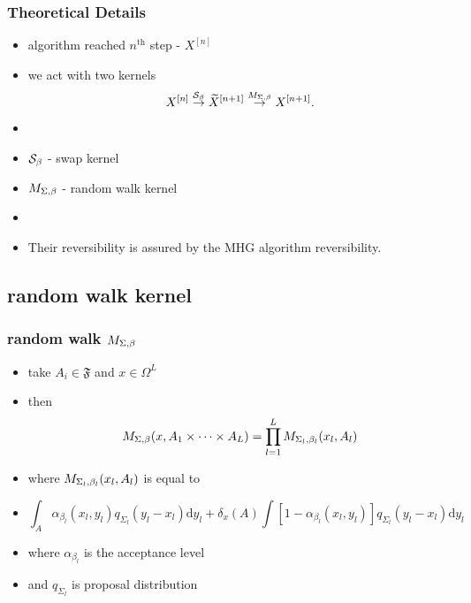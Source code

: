 \begin{frame}
		\frametitle{ Theoretical Details }

	\begin{itemize}
		\item[] algorithm reached $n^\text{th}$ step - $X^{[n]}$
		\item[] we act with two kernels
 $$X^{[n]} \overset{\mathcal{S}_{\beta}}{\rightarrow} \widetilde{X}^{[n +1]} \overset{M_{\Sigma,\beta}}{\rightarrow} X^{[n + 1]}.$$
		
		\item[]
		\item $\mathcal{S}_{\beta}$ - swap kernel
		\item $M_{\Sigma,\beta}$ - random walk kernel
		\item[]
		\item Their reversibility is assured by the MHG algorithm reversibility. 
	\end{itemize}

\end{frame}
		\subsection{random walk kernel}

\begin{frame}
		\frametitle{ random walk $M_{\Sigma,\beta}$ }

	\begin{itemize}
		\item[] take $A_i \in \mathfrak{F}$ and $x \in \Omega^L$
		\item[] then
  $$M_{\Sigma,\beta} (x, A_1 \times \dots \times A_L) = \prod_{l=1}^L M_{\Sigma_{l},\beta_{l}}(x_l, A_l)$$
		
		\item[] where $M_{\Sigma_{l},\beta_{l}}(x_l, A_l)$ is equal to  
		\item[] 
$$\int_A \alpha_{\beta_l} (x_l, y_l) q_{\Sigma_l} (y_l - x_l) \mathrm{d }y_l + \delta_x (A) \int [1 - \alpha_{\beta_l} (x_l, y_l)] q_{\Sigma_l} (y_l - x_l) \mathrm{d }y_l$$

		\item[] where $\alpha_{\beta_l}$ is the acceptance level 
		\item[] and $q_{\Sigma_l}$ is proposal distribution 
	\end{itemize}

\end{frame}

